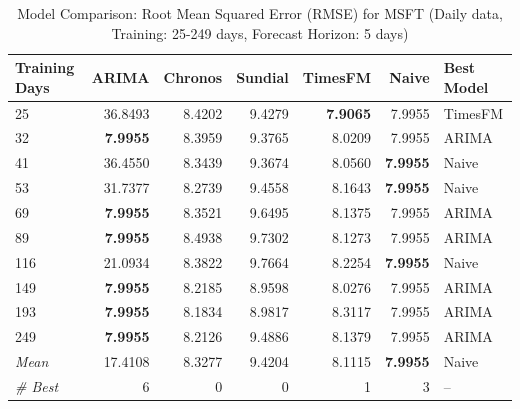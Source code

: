 \begin{table}[htbp]
\centering
\caption{Model Comparison: Root Mean Squared Error (RMSE) for MSFT (Daily data, Training: 25-249 days, Forecast Horizon: 5 days)}
\label{tab:comparison_MSFT_1d_train-less-year-log_h5_RMSE}
\small
\begin{tabular}{lrrrrrl}
\toprule
Training Days & ARIMA & Chronos & Sundial & TimesFM & Naive & Best Model \\
\midrule
25 & 36.8493 & 8.4202 & 9.4279 & \textbf{7.9065} & 7.9955 & TimesFM \\
32 & \textbf{7.9955} & 8.3959 & 9.3765 & 8.0209 & 7.9955 & ARIMA \\
41 & 36.4550 & 8.3439 & 9.3674 & 8.0560 & \textbf{7.9955} & Naive \\
53 & 31.7377 & 8.2739 & 9.4558 & 8.1643 & \textbf{7.9955} & Naive \\
69 & \textbf{7.9955} & 8.3521 & 9.6495 & 8.1375 & 7.9955 & ARIMA \\
89 & \textbf{7.9955} & 8.4938 & 9.7302 & 8.1273 & 7.9955 & ARIMA \\
116 & 21.0934 & 8.3822 & 9.7664 & 8.2254 & \textbf{7.9955} & Naive \\
149 & \textbf{7.9955} & 8.2185 & 8.9598 & 8.0276 & 7.9955 & ARIMA \\
193 & \textbf{7.9955} & 8.1834 & 8.9817 & 8.3117 & 7.9955 & ARIMA \\
249 & \textbf{7.9955} & 8.2126 & 9.4886 & 8.1379 & 7.9955 & ARIMA \\
\midrule
\textit{Mean} & 17.4108 & 8.3277 & 9.4204 & 8.1115 & \textbf{7.9955} & Naive \\
\textit{\# Best} & 6 & 0 & 0 & 1 & 3 & -- \\
\bottomrule
\end{tabular}
\end{table}